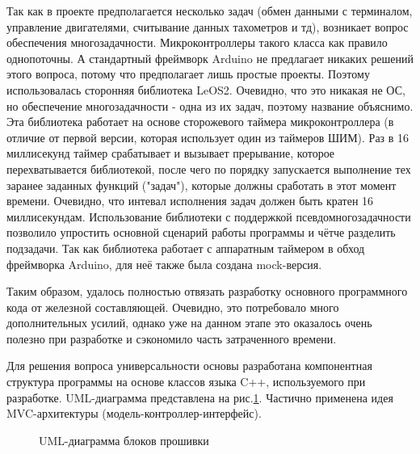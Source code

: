 \documentclass[14pt,a4paper,russian]{scrartcl}
\begin{document}
Так как в проекте предполагается несколько задач (обмен данными с терминалом,
управление двигателями, считывание данных тахометров и тд), возникает
вопрос обеспечения многозадачности. Микроконтроллеры такого класса 
как правило однопоточны. А стандартный фреймворк Arduino не предлагает
никаких решений этого вопроса, потому что предполагает лишь простые проекты.
Поэтому использовалась сторонняя библиотека LeOS2. Очевидно, что это никакая
не ОС, но обеспечение многозадачности - одна из их задач, поэтому название 
объяснимо. Эта библиотека работает на основе сторожевого таймера 
микроконтроллера (в отличие от первой версии, которая использует один из
таймеров ШИМ). Раз в 16 миллисекунд таймер срабатывает и вызывает прерывание,
которое перехватывается библиотекой, после чего по порядку запускается выполнение
тех заранее заданных функций ("задач"), которые должны сработать в этот момент
времени. Очевидно, что интевал исполнения задач должен быть кратен 16 миллисекундам.
Использование библиотеки с поддержкой псевдомногозадачности позволило
упростить основной сценарий работы программы и чётче разделить подзадачи.
Так как библиотека работает с аппаратным таймером в обход фреймворка Arduino,
для неё также была создана mock-версия. 

Таким образом, удалось полностью отвязать разработку основного 
программного кода от железной составляющей. Очевидно, это потребовало много
дополнительных усилий, однако уже на данном этапе это оказалось
очень полезно при разработке и сэкономило часть затраченного времени.

Для решения вопроса универсальности основы разработана компонентная
структура программы на основе классов языка C++, используемого при разработке.
UML-диаграмма представлена на рис.\ref{fig:firmware_uml}. Частично
применена идея MVC-архитектуры (модель-контроллер-интерфейс).
\begin{figure}[h]
    \caption{UML-диаграмма блоков прошивки}
    \label{fig:firmware_uml}
\end{figure}
\end{document}
